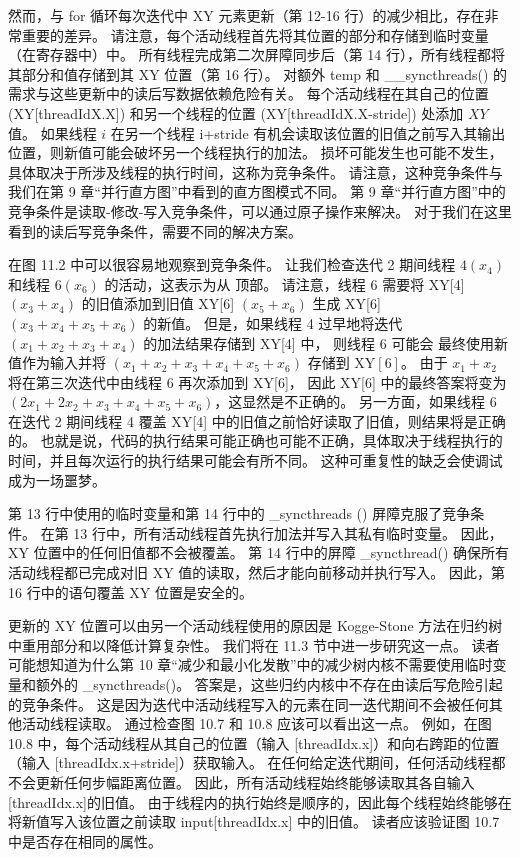 然而，与 for 循环每次迭代中 XY 元素更新（第 12-16 行）的减少相比，存在非常重要的差异。 
请注意，每个活动线程首先将其位置的部分和存储到临时变量（在寄存器中）中。 
所有线程完成第二次屏障同步后（第 14 行），所有线程都将其部分和值存储到其 $\mathrm{XY}$ 位置（第 16 行）。 
对额外 temp 和 \_\_syncthreads() 的需求与这些更新中的读后写数据依赖危险有关。 
每个活动线程在其自己的位置 (XY[threadIdX.X]) 和另一个线程的位置 (XY[threadIdX.X-stride]) 处添加 $X Y$ 值。 
如果线程 $i$ 在另一个线程 i+stride 有机会读取该位置的旧值之前写入其输出位置，则新值可能会破坏另一个线程执行的加法。 
损坏可能发生也可能不发生，具体取决于所涉及线程的执行时间，这称为竞争条件。 
请注意，这种竞争条件与我们在第 9 章“并行直方图”中看到的直方图模式不同。 
第 9 章“并行直方图”中的竞争条件是读取-修改-写入竞争条件，可以通过原子操作来解决。 
对于我们在这里看到的读后写竞争条件，需要不同的解决方案。

在图 11.2 中可以很容易地观察到竞争条件。 
让我们检查迭代 2 期间线程 $4\left(x_{4}\right)$ 和线程 $6\left(x_{6}\right)$ 的活动，这表示为从 顶部。 
请注意，线程 6 需要将 XY[4] $(x_{3}+x_{4})$ 的旧值添加到旧值 XY[6] $(x_{5}+x_ {6})$ 
生成 XY[6] $(x_{3}+x_{4}+x_{5}+x_{6})$ 的新值。 
但是，如果线程 4 过早地将迭代 $(x_{1}+x_{2}+x_{3}+x_{4})$ 的加法结果存储到 XY[4] 中，
则线程 6 可能会 最终使用新值作为输入并将 $(x_{1}+x_{2}+x_{3}+x_{4}+x_{5}+x_{6})$ 存储到 $ \mathrm{XY}[6]$。 
由于 $x_{1}+x_{2}$ 将在第三次迭代中由线程 6 再次添加到 XY[6]，
因此 XY[6] 中的最终答案将变为 $(2 x_{1}+2 x_{2}+x_{3}+x_{4}+x_{5}+x_{6})$，这显然是不正确的。 
另一方面，如果线程 6 在迭代 2 期间线程 4 覆盖 XY[4] 中的旧值之前恰好读取了旧值，则结果将是正确的。 
也就是说，代码的执行结果可能正确也可能不正确，具体取决于线程执行的时间，并且每次运行的执行结果可能会有所不同。 
这种可重复性的缺乏会使调试成为一场噩梦。

第 13 行中使用的临时变量和第 14 行中的 \_syncthreads () 屏障克服了竞争条件。
在第 13 行中，所有活动线程首先执行加法并写入其私有临时变量。 因此，XY 位置中的任何旧值都不会被覆盖。 
第 14 行中的屏障 \_syncthread() 确保所有活动线程都已完成对旧 XY 值的读取，然后才能向前移动并执行写入。 
因此，第 16 行中的语句覆盖 XY 位置是安全的。

更新的 XY 位置可以由另一个活动线程使用的原因是 Kogge-Stone 方法在归约树中重用部分和以降低计算复杂性。 
我们将在 11.3 节中进一步研究这一点。 
读者可能想知道为什么第 10 章“减少和最小化发散”中的减少树内核不需要使用临时变量和额外的 \_syncthreads()。 
答案是，这些归约内核中不存在由读后写危险引起的竞争条件。 
这是因为迭代中活动线程写入的元素在同一迭代期间不会被任何其他活动线程读取。 
通过检查图 10.7 和 10.8 应该可以看出这一点。 
例如，在图 10.8 中，每个活动线程从其自己的位置（输入 [threadIdx.x]）和向右跨距的位置（输入 [threadIdx.x+stride]）获取输入。 在任何给定迭代期间，任何活动线程都不会更新任何步幅距离位置。 
因此，所有活动线程始终能够读取其各自输入[threadIdx.x]的旧值。 
由于线程内的执行始终是顺序的，因此每个线程始终能够在将新值写入该位置之前读取 input[threadIdx.x] 中的旧值。 
读者应该验证图 10.7 中是否存在相同的属性。

